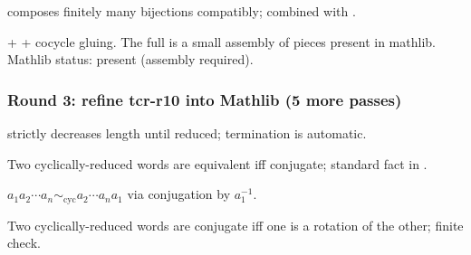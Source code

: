 \begin{lemma}
\label{lem:rgb-r14}
 composes finitely many bijections compatibly; combined with .
\leanok\mathlibok
\end{lemma}

\begin{lemma}
\label{lem:rgb-r15}
 +  + cocycle gluing.  The full  is a small assembly of pieces present in mathlib.  Mathlib status: present (assembly required).
\leanok\mathlibok
\end{lemma}

\subsubsection*{Round 3: refine tcr-r10 into Mathlib (5 more passes)}

\begin{lemma}
\label{lem:tcr-r11}
 strictly decreases length until reduced; termination is automatic.
\leanok\mathlibok
\end{lemma}

\begin{lemma}[Pass tcr.12: cyclic equivalence = conjugation]
\label{lem:tcr-r12}
Two cyclically-reduced words are equivalent iff conjugate; standard fact in .
\leanok\mathlibok
\end{lemma}

\begin{lemma}
\label{lem:tcr-r13}
$a_{1}a_{2}\cdots a_{n} \sim_{\mathrm{cyc}} a_{2}\cdots a_{n} a_{1}$ via conjugation by $a_{1}^{-1}$.
\leanok\mathlibok
\end{lemma}

\begin{lemma}
\label{lem:tcr-r14}
Two cyclically-reduced words are conjugate iff one is a rotation of the other; finite check.
\leanok
\end{lemma}

